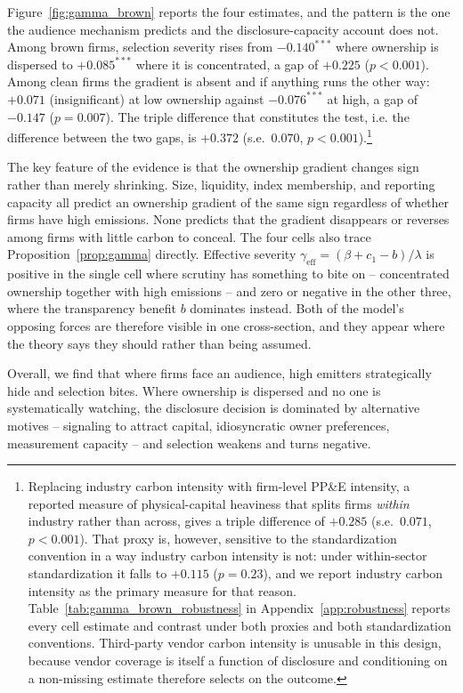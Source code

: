 \documentclass[a4paper,12pt]{article}
\begin{document}
Figure~\ref{fig:gamma_brown} reports the four estimates, and the pattern is the one the audience mechanism predicts and the disclosure-capacity account does not. Among brown firms, selection severity rises from $-0.140^{***}$ where ownership is dispersed to $+0.085^{***}$ where it is concentrated, a gap of $+0.225$ ($p<0.001$). Among clean firms the gradient is absent and if anything runs the other way: $+0.071$ (insignificant) at low ownership against $-0.076^{***}$ at high, a gap of $-0.147$ ($p=0.007$). The triple difference that constitutes the test, i.e. the difference between the two gaps, is $+0.372$ (s.e.\ $0.070$, $p<0.001$).\footnote{Replacing industry carbon intensity with firm-level PP\&E intensity, a reported measure of physical-capital heaviness that splits firms \emph{within} industry rather than across, gives a triple difference of $+0.285$ (s.e.\ $0.071$, $p<0.001$). That proxy is, however, sensitive to the standardization convention in a way industry carbon intensity is not: under within-sector standardization it falls to $+0.115$ ($p=0.23$), and we report industry carbon intensity as the primary measure for that reason. Table~\ref{tab:gamma_brown_robustness} in Appendix~\ref{app:robustness} reports every cell estimate and contrast under both proxies and both standardization conventions. Third-party vendor carbon intensity is unusable in this design, because vendor coverage is itself a function of disclosure and conditioning on a non-missing estimate therefore selects on the outcome.}

The key feature of the evidence is that the ownership gradient changes sign rather than merely shrinking. Size, liquidity, index membership, and reporting capacity all predict an ownership gradient of the same sign regardless of whether firms have high emissions. None predicts that the gradient disappears or reverses among firms with little carbon to conceal. The four cells also trace Proposition~\ref{prop:gamma} directly. Effective severity $\gamma_{\text{eff}} = (\beta + c_1 - b)/\lambda$ is positive in the single cell where scrutiny has something to bite on -- concentrated ownership together with high emissions -- and zero or negative in the other three, where the transparency benefit $b$ dominates instead. Both of the model's opposing forces are therefore visible in one cross-section, and they appear where the theory says they should rather than being assumed.

Overall, we find that where firms face an audience, high emitters strategically hide and selection bites. Where ownership is dispersed and no one is systematically watching, the disclosure decision is dominated by alternative motives -- signaling to attract capital, idiosyncratic owner preferences, measurement capacity -- and selection weakens and turns negative.
\end{document}
